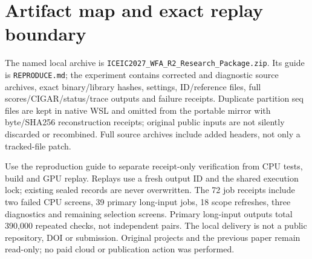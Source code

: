 \documentclass[11pt,a4paper]{article}
\begin{document}
\section{Artifact map and exact replay boundary}
The named local archive is \nolinkurl{ICEIC2027_WFA_R2_Research_Package.zip}. Its guide is \texttt{REPRODUCE.md}; the experiment contains corrected and diagnostic source archives, exact binary/library hashes, settings, ID/reference files, full scores/CIGAR/status/trace outputs and failure receipts. Duplicate partition seq files are kept in native WSL and omitted from the portable mirror with byte/SHA256 reconstruction receipts; original public inputs are not silently discarded or recombined. Full source archives include added headers, not only a tracked-file patch.

Use the reproduction guide to separate receipt-only verification from CPU tests, build and GPU replay. Replays use a fresh output ID and the shared execution lock; existing sealed records are never overwritten. The 72 job receipts include two failed CPU screens, 39 primary long-input jobs, 18 scope refreshes, three diagnostics and remaining selection screens. Primary long-input outputs total 390,000 repeated checks, not independent pairs. The local delivery is not a public repository, DOI or submission. Original projects and the previous paper remain read-only; no paid cloud or publication action was performed.
\end{document}
